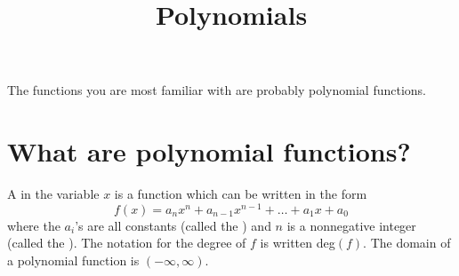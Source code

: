 \documentclass{ximera}
\title{Polynomials}
\begin{document}
\begin{abstract} \end{abstract}
\maketitle


The functions you are most familiar with are probably polynomial
functions.

\section{What are polynomial functions?}

\begin{definition}
  A  in the variable $x$ is a function
  which can be written in the form
  \[
  f(x) = a_nx^n + a_{n-1}x^{n-1} + \dots + a_1 x + a_0
  \]
  where the $a_i$'s are all constants (called the )
  and $n$ is a nonnegative integer (called the ). The notation for the degree of $f$ is written deg$(f)$. The domain of a polynomial function is $(-\infty,\infty)$.
\end{definition}
\end{document}
